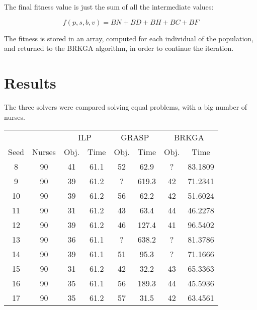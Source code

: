 \documentclass[12pt,a4paper]{article}
\begin{document}
The final fitness value is just the sum of all the intermediate values:

$$ f(p,s,b,v) = BN + BD + BH + BC + BF $$

The fitness is stored in an array, computed for each individual of the 
population, and returned to the BRKGA algorithm, in order to continue the 
iteration.

\section{Results}

The three solvers were compared solving equal problems, with a big number of 
nurses.

\begin{table}[h]
\centering
\begin{tabular}{cccccccc}
\toprule
       &          &\multicolumn{2}{c}{ILP} & \multicolumn{2}{c}{GRASP} & \multicolumn{2}{c}{BRKGA} \\
Seed   &  Nurses  & Obj. & Time & Obj. & Time & Obj. & Time \\
\midrule
     8 &     90   &     41   & 61.1    &       52  &   62.9      &     ?      &  83.1809 \\
     9 &     90   &     39   & 61.2    &       ?   &  619.3      &     42     &  71.2341 \\
    10 &     90   &     39   & 61.2    &       56  &   62.2      &     42     &  51.6024 \\
    11 &     90   &     31   & 61.2    &       43  &   63.4      &     44     &  46.2278 \\
    12 &     90   &     39   & 61.2    &       46  &  127.4      &     41     &  96.5402 \\
    13 &     90   &     36   & 61.1    &       ?   &  638.2      &     ?      &  81.3786 \\
    14 &     90   &     39   & 61.1    &       51  &   95.3      &     ?      &  71.1666 \\
    15 &     90   &     31   & 61.2    &       42  &   32.2      &     43     &  65.3363 \\
    16 &     90   &     35   & 61.1    &       56  &  189.3      &     44     &  45.5936 \\
    17 &     90   &     35   & 61.2    &       57  &   31.5      &     42     &  63.4561 \\
\bottomrule
\end{tabular}
\end{table}
\end{document}
